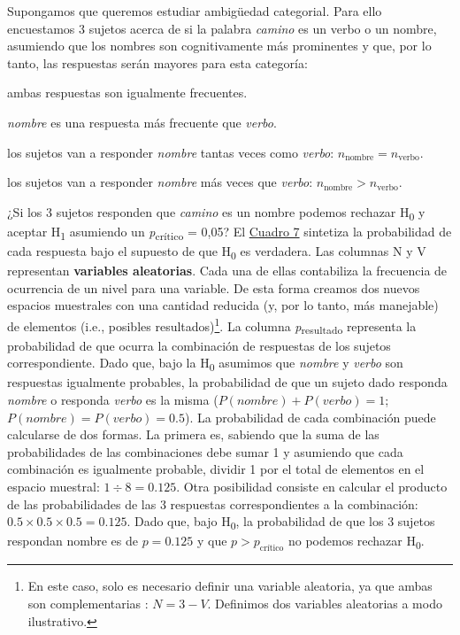 \documentclass[12pt,spanish,a4paper,]{article}
\providecommand{\tightlist}{%
  \setlength{\itemsep}{0pt}\setlength{\parskip}{0pt}}
\let\rmarkdownfootnote\footnote%
\def\footnote{\protect\rmarkdownfootnote}
\begin{document}
Supongamos que queremos estudiar ambigüedad categorial. Para ello
encuestamos 3 sujetos acerca de si la palabra \emph{camino} es un verbo
o un nombre, asumiendo que los nombres son cognitivamente más
prominentes y que, por lo tanto, las respuestas serán mayores para esta
categoría:

\begin{description}
\tightlist
\item[H\textsubscript{0} textual]
ambas respuestas son igualmente frecuentes.
\item[H\textsubscript{1} textual]
\emph{nombre} es una respuesta más frecuente que \emph{verbo}.
\item[H\textsubscript{0} estadística]
los sujetos van a responder \emph{nombre} tantas veces como
\emph{verbo}: \(n_{\textrm{nombre}} = n_{\textrm{verbo}}\).
\item[H\textsubscript{1} estadística]
los sujetos van a responder \emph{nombre} más veces que \emph{verbo}:
\(n_{\textrm{nombre}} > n_{\textrm{verbo}}\).
\end{description}

¿Si los 3 sujetos responden que \emph{camino} es un nombre podemos
rechazar H\textsubscript{0} y aceptar H\textsubscript{1} asumiendo un
\emph{p}\textsubscript{crítico} = 0,05? El
\protect\hyperlink{prob}{Cuadro 7} sintetiza la probabilidad de cada
respuesta bajo el supuesto de que H\textsubscript{0} es verdadera. Las
columnas N y V representan \textbf{variables aleatorias}. Cada una de
ellas contabiliza la frecuencia de ocurrencia de un nivel para una
variable. De esta forma creamos dos nuevos espacios muestrales con una
cantidad reducida (y, por lo tanto, más manejable) de elementos (i.e.,
posibles resultados)\footnote{En este caso, solo es necesario definir
  una variable aleatoria, ya que ambas son complementarias :
  \(N = 3 - V\). Definimos dos variables aleatorias a modo ilustrativo.}.
La columna \emph{p}\textsubscript{resultado} representa la probabilidad
de que ocurra la combinación de respuestas de los sujetos
correspondiente. Dado que, bajo la H\textsubscript{0} asumimos que
\emph{nombre} y \emph{verbo} son respuestas igualmente probables, la
probabilidad de que un sujeto dado responda \emph{nombre} o responda
\emph{verbo} es la misma (\(P(nombre) + P(verbo) = 1\);
\(P(nombre) = P(verbo) = 0.5\)). La probabilidad de cada combinación
puede calcularse de dos formas. La primera es, sabiendo que la suma de
las probabilidades de las combinaciones debe sumar 1 y asumiendo que
cada combinación es igualmente probable, dividir 1 por el total de
elementos en el espacio muestral: \(1 \div 8 = 0.125\). Otra posibilidad
consiste en calcular el producto de las probabilidades de las 3
respuestas correspondientes a la combinación:
\(0.5 \times 0.5 \times 0.5 = 0.125\). Dado que, bajo
H\textsubscript{0}, la probabilidad de que los 3 sujetos respondan
nombre es de \(p = 0.125\) y que \(p > p_{\textrm{crítico}}\) no podemos
rechazar H\textsubscript{0}.
\end{document}
